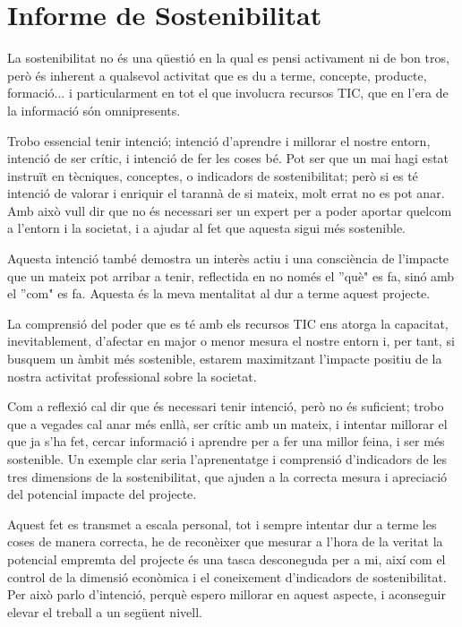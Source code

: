\documentclass[a4paper]{article} %
\begin{document}
	\section{Informe de Sostenibilitat}
	La sostenibilitat no és una qüestió en la qual es pensi activament ni de bon tros, però és inherent a qualsevol activitat que es du a terme, concepte, producte, formació... i particularment en tot el que involucra recursos TIC, que en l'era de la informació són omnipresents. \par
	Trobo essencial tenir intenció; intenció d'aprendre i millorar el nostre entorn, intenció de ser crític, i intenció de fer les coses bé. Pot ser que un mai hagi estat instruït en tècniques, conceptes, o indicadors de sostenibilitat; però si es té intenció de valorar i enriquir el tarannà de si mateix, molt errat no es pot anar. Amb això vull dir que no és necessari ser un expert per a poder aportar quelcom a l'entorn i la societat, i a ajudar al fet que aquesta sigui més sostenible. \par
	Aquesta intenció també demostra un interès actiu i una consciència de l'impacte que un mateix pot arribar a tenir, reflectida en no només el ''què" es fa, sinó amb el ''com" es fa. Aquesta és la meva mentalitat al dur a terme aquest projecte. \par
	La comprensió del poder que es té amb els recursos TIC ens atorga la capacitat, inevitablement, d'afectar en major o menor mesura el nostre entorn i, per tant, si busquem un àmbit més sostenible, estarem maximitzant l'impacte positiu de la nostra activitat professional sobre la societat. \par
	Com a reflexió cal dir que és necessari tenir intenció, però no és suficient; trobo que a vegades cal anar més enllà, ser crític amb un mateix, i intentar millorar el que ja s'ha fet, cercar informació i aprendre per a fer una millor feina, i ser més sostenible. Un exemple clar seria l'aprenentatge i comprensió d'indicadors de les tres dimensions de la sostenibilitat, que ajuden a la correcta mesura i apreciació del potencial impacte del projecte. \par
	Aquest fet es transmet a escala personal, tot i sempre intentar dur a terme les coses de manera correcta, he de reconèixer que mesurar a l'hora de la veritat la potencial empremta del projecte és una tasca desconeguda per a mi, així com el control de la dimensió econòmica i el coneixement d'indicadors de sostenibilitat. Per això parlo d'intenció, perquè espero millorar en aquest aspecte, i aconseguir elevar el treball a un següent nivell.
	
\end{document}
